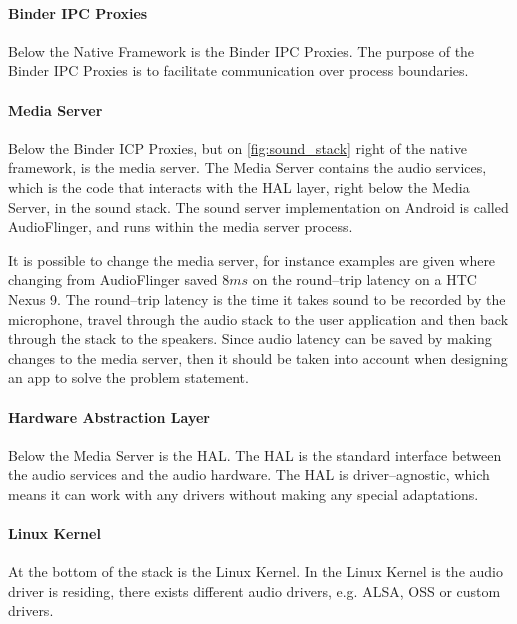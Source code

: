 \paragraph{Binder IPC Proxies}
Below the Native Framework is the Binder IPC Proxies.
The purpose of the Binder IPC Proxies is to facilitate communication over process boundaries.

\paragraph{Media Server}
Below the Binder ICP Proxies, but on \cref{fig:sound_stack} right of the native framework, is the media server.
The Media Server contains the audio services, which is the code that interacts with the \ac{HAL} layer,
right below the Media Server, in the sound stack.
The sound server implementation on Android is called AudioFlinger, and runs within the media server process\cite{audioflinger}.

It is possible to change the media server, 
for instance examples are given where changing from AudioFlinger saved $8 ms$ on the round--trip latency on a HTC Nexus 9\cite{superpowered_8ms}.
The round--trip latency is the time it takes sound to be recorded by the microphone,
travel through the audio stack to the user application and then back through the stack to the speakers\cite{superpowered_8ms}.
Since audio latency can be saved by making changes to the media server,
then it should be taken into account when designing an app to solve the problem statement.

\paragraph{Hardware Abstraction Layer}
Below the Media Server is the \ac{HAL}.
The \ac{HAL} is the standard interface between the audio services and the audio hardware.
The \ac{HAL} is driver--agnostic, which means it can work with any drivers without making any special adaptations.

\paragraph{Linux Kernel}
At the bottom of the stack is the Linux Kernel.
In the Linux Kernel is the audio driver is residing,
there exists different audio drivers, e.g. \ac{ALSA}, \ac{OSS} or custom drivers. 

